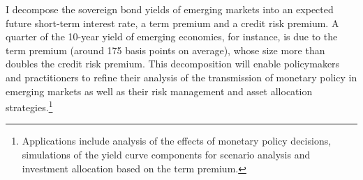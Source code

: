 {I decompose the sovereign bond yields of emerging markets into an expected future short-term interest rate, a term premium and a credit risk premium. 
A quarter of the 10-year yield of emerging economies, for instance, is due to the term premium (around 175 basis points on average), whose size more than doubles the credit risk premium. 
This decomposition will enable policymakers and practitioners to refine their analysis of the transmission of monetary policy in emerging markets as well as their risk management and asset allocation strategies.\footnote{ Applications include analysis of the effects of monetary policy decisions, simulations of the yield curve components for scenario analysis and investment allocation based on the term premium.}


}
